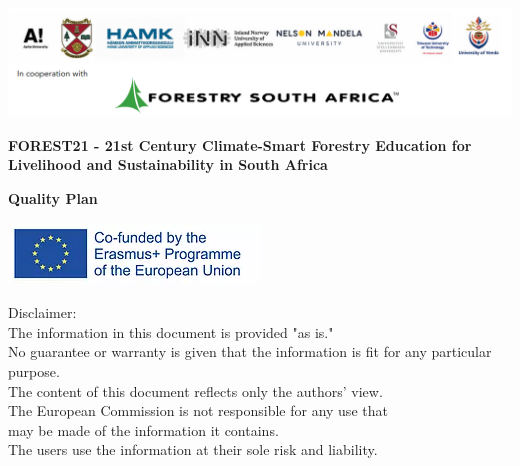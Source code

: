 \documentclass[
  11pt,
]{article}
\author{}
\date{\vspace{-2.5em}}
\begin{document}
\pagecolor{darkseagreen}

\subsectionfont{\raggedright}
\subsubsectionfont{\raggedright}

\thispagestyle{empty}

\begin{centering}

\vspace{3cm}


\includegraphics[width=1\linewidth]{Partner_logos} 

\vspace{3cm}

\Large
{\bf FOREST21 - 21st Century Climate-Smart Forestry Education for Livelihood
  and Sustainability in South Africa}
  
\vspace{2cm}

\Large
{\bf Quality Plan}

\vspace{4cm}

\normalsize
\singlespacing


\includegraphics[width=1\linewidth]{EU_logo} 

\vspace{0.5 cm}

Disclaimer:\\
The information in this document is provided "as is."\\
No guarantee or warranty is given that the information is fit for any particular purpose.\\
The content of this document reflects only the authors' view.\\
The European Commission is not responsible for any use that\\
may be made of the information it contains.\\
The users use the information at their sole risk and liability.

\vspace{1.5 cm}

\end{centering}
\end{document}
